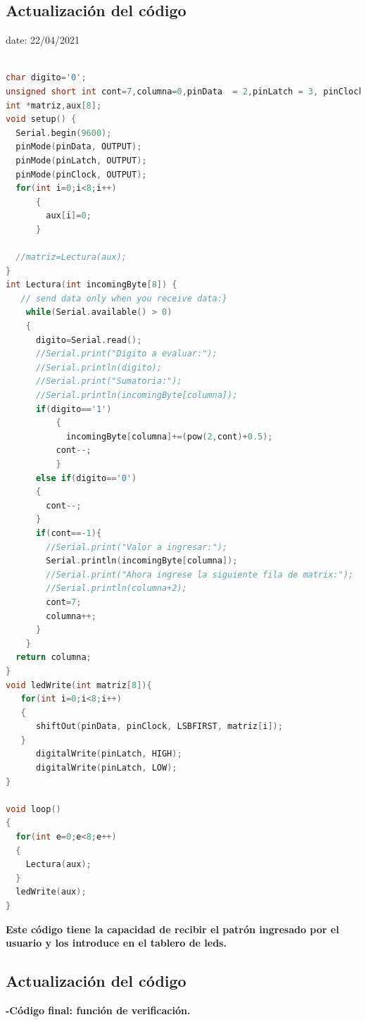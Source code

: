 \documentclass{article}
\begin{document}
\subsection{Actualización del código}
date: 22/04/2021
\begin{lstlisting}[language=C++, label=codigocompleto2]

char digito='0';
unsigned short int cont=7,columna=0,pinData  = 2,pinLatch = 3, pinClock = 4;
int *matriz,aux[8];
void setup() {
  Serial.begin(9600);
  pinMode(pinData, OUTPUT);
  pinMode(pinLatch, OUTPUT);
  pinMode(pinClock, OUTPUT);
  for(int i=0;i<8;i++)
      {
        aux[i]=0;
      }

  //matriz=Lectura(aux);
}
int Lectura(int incomingByte[8]) {
   // send data only when you receive data:}
    while(Serial.available() > 0)
    {
      digito=Serial.read();
      //Serial.print("Digito a evaluar:");
      //Serial.println(digito); 
      //Serial.print("Sumatoria:");
      //Serial.println(incomingByte[columna]);
      if(digito=='1')
          {
            incomingByte[columna]+=(pow(2,cont)+0.5);
          cont--;
          }
      else if(digito=='0')
      {
        cont--;
      }
      if(cont==-1){
        //Serial.print("Valor a ingresar:");
        Serial.println(incomingByte[columna]);
        //Serial.print("Ahora ingrese la siguiente fila de matrix:");
        //Serial.println(columna+2);
        cont=7;
        columna++;
      }
    }
  return columna;
}
void ledWrite(int matriz[8]){
   for(int i=0;i<8;i++)
   {   
      shiftOut(pinData, pinClock, LSBFIRST, matriz[i]);
   }
      digitalWrite(pinLatch, HIGH);
      digitalWrite(pinLatch, LOW);
}

void loop()
{
  for(int e=0;e<8;e++)
  {
    Lectura(aux);
  }
  ledWrite(aux);
}

 \end{lstlisting}
 
\textbf{Este código tiene la capacidad de recibir el patrón ingresado por el usuario y los introduce en el tablero de leds.}
 
 
 
 
 
 

\subsection{Actualización del código}
\textbf{-Código final: función de verificación.}
\end{document}
